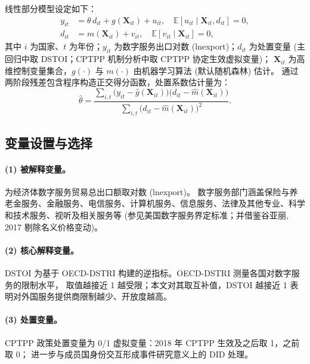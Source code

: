 \documentclass[11pt,a4paper]{article}
\begin{document}
线性部分模型设定如下：
\begin{align}
y_{it}   &= \theta\,d_{it} + g(\mathbf{X}_{it}) + u_{it}, \quad \mathbb{E}[u_{it} \mid \mathbf{X}_{it}, d_{it}] = 0, \\
d_{it}   &= m(\mathbf{X}_{it}) + v_{it}, \quad \mathbb{E}[v_{it} \mid \mathbf{X}_{it}] = 0,
\end{align}
其中 $i$ 为国家、$t$ 为年份；$y_{it}$ 为数字服务出口对数 (lnexport)；$d_{it}$ 为处置变量
(主回归中取 DSTOI；CPTPP 机制分析中取 CPTPP 协定生效虚拟变量)；
$\mathbf{X}_{it}$ 为高维控制变量集合，$g(\cdot)$ 与 $m(\cdot)$ 由机器学习算法 (默认随机森林) 估计。
通过两阶段残差包含程序构造正交得分函数，处置系数估计量为：
\begin{equation}
\hat{\theta} = \frac{\sum_{i,t} \big(y_{it} - \hat g(\mathbf{X}_{it})\big)\big(d_{it} - \hat m(\mathbf{X}_{it})\big)}
                    {\sum_{i,t} \big(d_{it} - \hat m(\mathbf{X}_{it})\big)^{2}}.
\end{equation}

\subsection{变量设置与选择}

\paragraph{(1) 被解释变量。}
为经济体数字服务贸易总出口额取对数 (lnexport)。
数字服务部门涵盖保险与养老金服务、金融服务、电信服务、计算机服务、信息服务、法律及其他专业、科学和技术服务、视听及相关服务等
(参见美国数字服务界定标准；并借鉴谷亚丽, 2017 剔除名义价格变动)。

\paragraph{(2) 核心解释变量。}
DSTOI 为基于 OECD-DSTRI 构建的逆指标。OECD-DSTRI 测量各国对数字服务的限制水平，
取值越接近 1 越受限；本文对其取互补值，DSTOI 越接近 1 表明对外国服务提供商限制越少、开放度越高。

\paragraph{(3) 处置变量。}
CPTPP 政策处置变量为 0/1 虚拟变量：2018 年 CPTPP 生效及之后取 1，之前取 0；
进一步与成员国身份交互形成事件研究意义上的 DID 处理。
\end{document}
